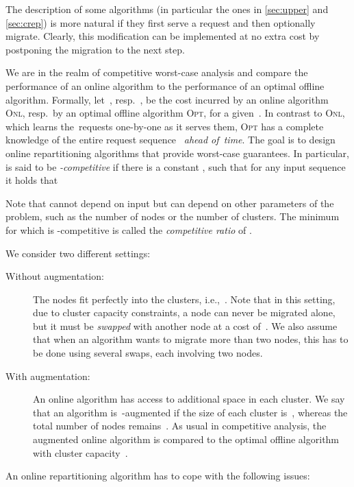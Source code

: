 \documentclass{siamart190516}
\newcommand{\ONL}{\textsc{Onl}\xspace}
\newcommand{\OPT}{\textsc{Opt}\xspace}
\begin{document}
The description of some algorithms (in particular the ones in \cref{sec:upper}
and \cref{sec:crep}) is more natural if they first serve a request and then
optionally migrate. Clearly, this modification can be implemented at no extra cost by
postponing the migration to the next step.

We are in the realm of competitive worst-case analysis and compare the
performance of an online algorithm to the performance of an optimal offline
algorithm. Formally, let~, resp.~, be the cost
incurred by an online algorithm \ONL, resp.~by an optimal offline
algorithm \OPT, for a given~. In contrast to \ONL, which learns the~requests one-by-one as
it serves them, \OPT has a complete knowledge of the entire request
sequence~ \emph{ahead of~time}. The goal is to design online repartitioning
algorithms that provide worst-case guarantees. In particular,  is said
to be \emph{-competitive} if there is a constant , such that for any
input sequence~ it holds that

Note that  cannot depend on input  but can depend on other
parameters of the problem, such as the number of nodes or the number of clusters.
The minimum  for which  is -competitive is called the 
\emph{competitive ratio} of . 

We consider two different settings:

\begin{description}

\item[Without augmentation:] The nodes fit perfectly into the clusters,
i.e.,~. Note that in this setting, due to cluster capacity
constraints, a node can never be migrated alone, but it must be \emph{swapped}
with another node at a cost of~. We also assume that when an
algorithm wants to migrate more than two nodes, this has to be done using
several swaps, each involving two nodes.

\item[With augmentation:] An online algorithm has access to additional space
in each cluster. We say that an algorithm is~-augmented if the size of
each cluster is~, whereas the total number of nodes
remains~. As usual in competitive analysis,
the augmented online algorithm is compared to the optimal offline algorithm
with cluster capacity~.
\end{description}

An online repartitioning algorithm has to cope with the following issues:
\end{document}
